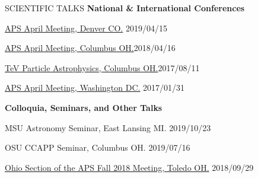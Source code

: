 \documentclass{resume} %
\begin{document}

\begin{rSection}{SCIENTIFIC TALKS}
{\bf National \& International Conferences}
\begin{etaremune}
\item \href{http://meetings.aps.org/Meeting/APR19/Session/R08.4}{APS April Meeting, Denver CO.} \hfill 2019/04/15

\item \href{http://meetings.aps.org/Meeting/APR18/Session/U17.7}{APS April Meeting, Columbus OH.}\hfill 2018/04/16

\item \href{http://indico.cern.ch/event/615891/contributions/2648790/}{TeV Particle Astrophysics, Columbus OH.}\hfill 2017/08/11

\item \href{http://meetings.aps.org/Meeting/APR17/Session/Y3.2}{APS April Meeting, Washington DC.} \hfill 2017/01/31
\end{etaremune}

{\bf Colloquia, Seminars, and Other Talks}
\begin{etaremune}

\item MSU Astronomy Seminar, East Lansing MI. \hfill 2019/10/23

\item OSU CCAPP Seminar, Columbus OH. \hfill 2019/07/16

\item \href{http://meetings.aps.org/Meeting/OSF18/Session/A01.2}{Ohio Section of the APS Fall 2018 Meeting, Toledo OH.} \hfill 2018/09/29


\end{etaremune}
\end{rSection}
\end{document}
